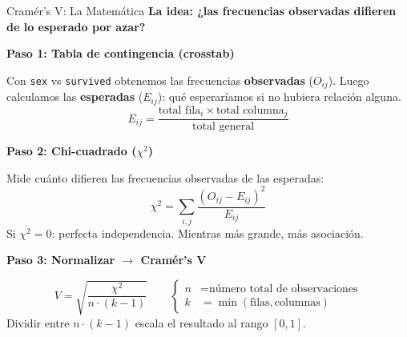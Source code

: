 \documentclass[aspectratio=169, 11pt]{beamer}
\begin{document}
\begin{frame}[shrink=21]{Cramér's V: La Matemática}
  \vspace{-4pt}
  {\footnotesize\color{arcaDark}\bfseries
    La idea: ¿las frecuencias observadas difieren de lo esperado por azar?}

  \vspace{4pt}
  {\scriptsize\bfseries Paso 1: Tabla de contingencia (crosstab)}
  \vspace{2pt}

  {\scriptsize
    Con \texttt{sex} vs \texttt{survived} obtenemos las frecuencias
    \textbf{observadas} ($O_{ij}$). Luego calculamos las
    \textbf{esperadas} ($E_{ij}$): qué esperaríamos si no hubiera
    relación alguna.
  \[
    E_{ij} = \frac{\text{total fila}_i \times \text{total columna}_j}
                   {\text{total general}}
  \]
  }

  \vspace{2pt}
  {\scriptsize\bfseries Paso 2: Chi-cuadrado ($\chi^2$)}
  \vspace{2pt}

  {\scriptsize
    Mide cuánto difieren las frecuencias observadas de las esperadas:
  \[
    \chi^2 = \sum_{i,j}
      \frac{(O_{ij} - E_{ij})^2}{E_{ij}}
  \]
    Si $\chi^2 = 0$: perfecta independencia.
    Mientras más grande, más asociación.
  }

  \vspace{2pt}
  {\scriptsize\bfseries Paso 3: Normalizar $\to$ Cramér's V}
  \vspace{2pt}

  {\scriptsize
  \[
    V = \sqrt{\frac{\chi^2}{n \cdot (k - 1)}}
    \qquad
    \begin{cases}
      n &= \text{número total de observaciones} \\
      k &= \min(\text{filas}, \text{columnas})
    \end{cases}
  \]
    Dividir entre $n \cdot (k-1)$ escala el resultado al rango $[0, 1]$.
  }
\end{frame}
\end{document}
